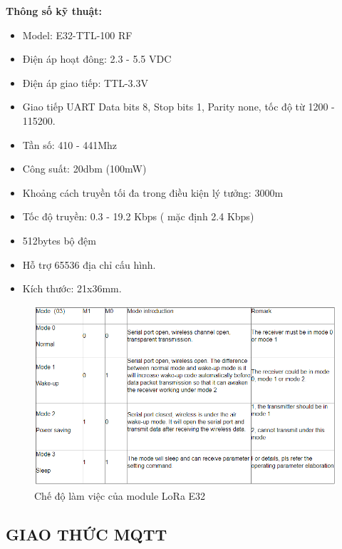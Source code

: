 \indent \textbf{Thông số kỹ thuật:}
\begin{itemize}
	\item Model: E32-TTL-100 RF
	\item Điện áp hoạt đông: 2.3 - 5.5 VDC
	\item Điện áp giao tiếp: TTL-3.3V
	\item Giao tiếp UART Data bits 8, Stop bits 1, Parity none, tốc độ từ 1200 - 115200.
	\item Tần số: 410 - 441Mhz
	\item Công suất: 20dbm (100mW)
	\item Khoảng cách truyền tối đa trong điều kiện lý tưởng: 3000m
	\item Tốc độ truyền: 0.3 - 19.2 Kbps ( mặc định 2.4 Kbps)
	\item 512bytes bộ đệm
	\item Hỗ trợ 65536 địa chỉ cấu hình.
	\item Kích thước: 21x36mm.
\end{itemize}
\begin{figure}[H]
	\centering
	\includegraphics[scale=.5]{Chapter 2/image chapter 2/workmodeE32.png}
	\caption[Chế độ làm việc của module LoRa E32]{Chế độ làm việc của module LoRa E32}
	\label{hinh24}
\end{figure}
\subsection{GIAO THỨC MQTT}
